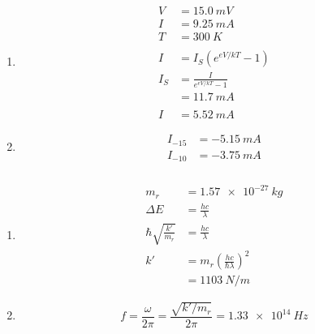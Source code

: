 \documentclass{article}
\begin{document}
\setcounter{subsubsection}{30}
\subsubsection{}

\begin{enumerate}
  \item

        \begin{align*}
          V   & = \qty{15.0}{mV}              \\
          I   & = \qty{9.25}{mA}              \\
          T   & = \qty{300}{K}                \\ \\
          I   & = I_S (e^{e V / k T} - 1)     \\
          I_S & = \frac{I}{e^{e V / k T} - 1} \\
              & = \qty{11.7}{mA}              \\ \\
          I   & = \qty{5.52}{mA}
        \end{align*}

  \item

        \begin{align*}
          I_{-15} & = \qty{-5.15}{mA} \\
          I_{-10} & = \qty{-3.75}{mA}
        \end{align*}
\end{enumerate}

\setcounter{subsubsection}{32}
\subsubsection{}

\begin{enumerate}
  \item

        \begin{align*}
          m_r                         & = \qty{1.57e-27}{kg}                             \\
          \Delta E                    & = \frac{h c}{\lambda}                            \\
          \hbar \sqrt{\frac{k'}{m_r}} & = \frac{h c}{\lambda}                            \\
          k'                          & = m_r \left( \frac{h c}{\hbar \lambda} \right)^2 \\
                                      & = \qty{1103}{N/m}
        \end{align*}

  \item

        \[f = \frac{\omega}{2 \pi} = \frac{\sqrt{k' / m_r}}{2 \pi} = \qty{1.33e14}{Hz}\]
\end{enumerate}
\end{document}
